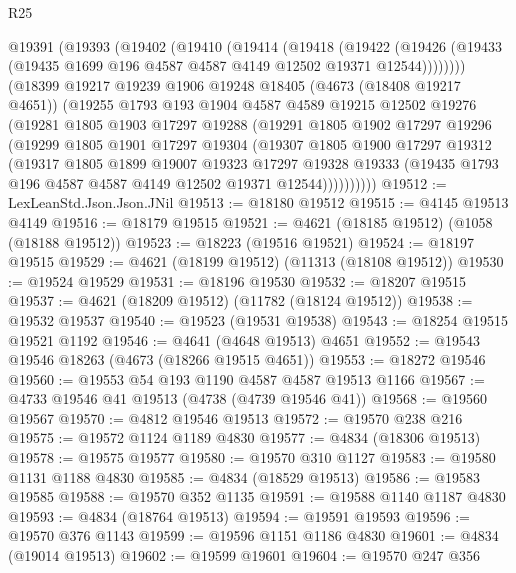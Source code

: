 \begin{lexlean}{R25}
\begin{coremodule}
    @19391
      (@19393
        (@19402
          (@19410
            (@19414
              (@19418
                (@19422
                  (@19426 (@19433 (@19435 @1699 @196 @4587 @4587 @4149 @12502 @19371 @12544))))))))
        (@18399
          @19217
          @19239
          @1906
          @19248
          @18405
          (@4673 (@18408 @19217 @4651))
          (@19255
            @1793
            @193
            @1904
            @4587
            @4589
            @19215
            @12502
            @19276
            (@19281
              @1805
              @1903
              @17297
              @19288
              (@19291
                @1805
                @1902
                @17297
                @19296
                (@19299
                  @1805
                  @1901
                  @17297
                  @19304
                  (@19307
                    @1805
                    @1900
                    @17297
                    @19312
                    (@19317
                      @1805
                      @1899
                      @19007
                      @19323
                      @17297
                      @19328
                      @19333
                      (@19435 @1793 @196 @4587 @4587 @4149 @12502 @19371 @12544))))))))))
@19512 := LexLeanStd.Json.Json.JNil
@19513 := @18180 @19512
@19515 := @4145 @19513 @4149
@19516 := @18179 @19515
@19521 := @4621 (@18185 @19512) (@1058 (@18188 @19512))
@19523 := @18223 (@19516 @19521)
@19524 := @18197 @19515
@19529 := @4621 (@18199 @19512) (@11313 (@18108 @19512))
@19530 := @19524 @19529
@19531 := @18196 @19530
@19532 := @18207 @19515
@19537 := @4621 (@18209 @19512) (@11782 (@18124 @19512))
@19538 := @19532 @19537
@19540 := @19523 (@19531 @19538)
@19543 := @18254 @19515 @19521 @1192
@19546 := @4641 (@4648 @19513) @4651
@19552 := @19543 @19546 @18263 (@4673 (@18266 @19515 @4651))
@19553 := @18272 @19546
@19560 := @19553 @54 @193 @1190 @4587 @4587 @19513 @1166
@19567 := @4733 @19546 @41 @19513 (@4738 (@4739 @19546 @41))
@19568 := @19560 @19567
@19570 := @4812 @19546 @19513
@19572 := @19570 @238 @216
@19575 := @19572 @1124 @1189 @4830
@19577 := @4834 (@18306 @19513)
@19578 := @19575 @19577
@19580 := @19570 @310 @1127
@19583 := @19580 @1131 @1188 @4830
@19585 := @4834 (@18529 @19513)
@19586 := @19583 @19585
@19588 := @19570 @352 @1135
@19591 := @19588 @1140 @1187 @4830
@19593 := @4834 (@18764 @19513)
@19594 := @19591 @19593
@19596 := @19570 @376 @1143
@19599 := @19596 @1151 @1186 @4830
@19601 := @4834 (@19014 @19513)
@19602 := @19599 @19601
@19604 := @19570 @247 @356

\end{coremodule}
\end{lexlean}
